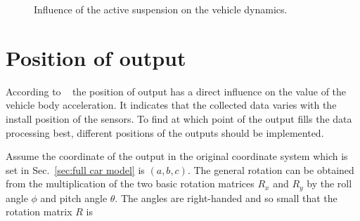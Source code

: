 \begin{figure}
 \caption{Influence of the active suspension on the vehicle dynamics.}
 \label{fig:active_suspension}
 \end{figure}
 
 \section{Position of output}
 \label{sec:positionofoutput}
 According to ~\cite{wallentowitz1997vertikal} the position of output has a direct influence on the value of the vehicle body acceleration.
 It indicates that the collected data varies with the install position of the sensors.
 To find at which point of the output fills the data processing best, different positions of the outputs should be implemented. 
 
 Assume the coordinate of the output in the original coordinate system which is set in Sec.~\ref{sec:full car model} is $(a,b,c)$. 
 The general rotation can be obtained from the multiplication of the two basic rotation matrices $R_x$ and $R_y$ by the roll angle $\phi$ and pitch angle $\theta$. The angles are right-handed and so small that the rotation matrix $R$ is
 
